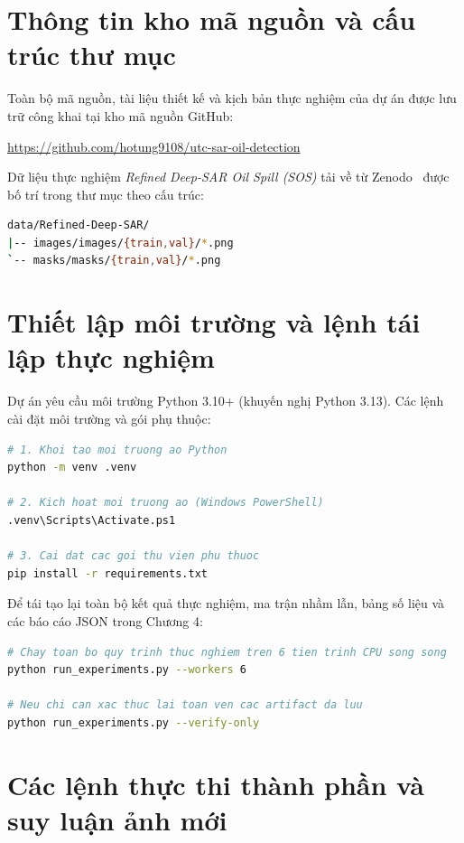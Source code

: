 \section{Thông tin kho mã nguồn và cấu trúc thư mục}

Toàn bộ mã nguồn, tài liệu thiết kế và kịch bản thực nghiệm của dự án được lưu trữ công khai tại kho mã nguồn GitHub:
\begin{center}
\url{https://github.com/hotung9108/utc-sar-oil-detection}
\end{center}

Dữ liệu thực nghiệm \textit{Refined Deep-SAR Oil Spill (SOS)} tải về từ Zenodo~\cite{zuenko2025refined} được bố trí trong thư mục theo cấu trúc:
\begin{lstlisting}[language=bash]
data/Refined-Deep-SAR/
|-- images/images/{train,val}/*.png
`-- masks/masks/{train,val}/*.png
\end{lstlisting}

\section{Thiết lập môi trường và lệnh tái lập thực nghiệm}

Dự án yêu cầu môi trường Python 3.10+ (khuyến nghị Python 3.13). Các lệnh cài đặt môi trường và gói phụ thuộc:

\begin{lstlisting}[language=bash]
# 1. Khoi tao moi truong ao Python
python -m venv .venv

# 2. Kich hoat moi truong ao (Windows PowerShell)
.venv\Scripts\Activate.ps1

# 3. Cai dat cac goi thu vien phu thuoc
pip install -r requirements.txt
\end{lstlisting}

Để tái tạo lại toàn bộ kết quả thực nghiệm, ma trận nhầm lẫn, bảng số liệu và các báo cáo JSON trong Chương 4:

\begin{lstlisting}[language=bash]
# Chay toan bo quy trinh thuc nghiem tren 6 tien trinh CPU song song
python run_experiments.py --workers 6

# Neu chi can xac thuc lai toan ven cac artifact da luu
python run_experiments.py --verify-only
\end{lstlisting}

\section{Các lệnh thực thi thành phần và suy luận ảnh mới}

